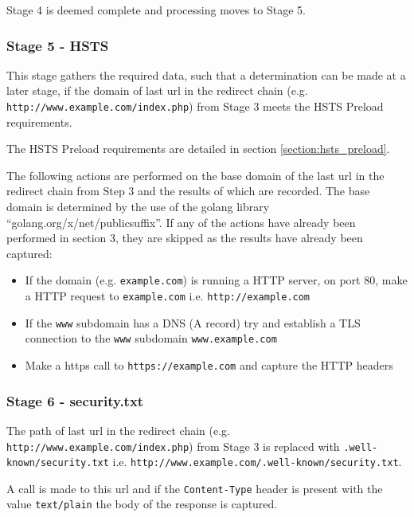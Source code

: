 \documentclass{mscreport}
\begin{document}
\vspace{0.3cm} \noindent
Stage 4 is deemed complete and processing moves to Stage 5.

\subsubsection{Stage 5 - HSTS}

This stage gathers the required data, such that a determination can be made at a later stage, if the domain of last url in the redirect chain (e.g. \texttt{http://www.example.com/index.php}) from Stage 3 meets the HSTS Preload requirements.

\vspace{0.3cm} \noindent
The HSTS Preload requirements are detailed in section \ref{section:hsts_preload}.

\vspace{0.3cm} \noindent
The following actions are performed on the base domain of the last url in the redirect chain from Step 3 and the results of which are recorded. The base domain is determined by the use of the golang library ``golang.org/x/net/publicsuffix''. If any of the actions have already been performed in section 3, they are skipped as the results have already been captured:

\begin{itemize}
	\setlength\itemsep{0.1em}
    \item If the domain (e.g. \texttt{example.com}) is running a HTTP server, on port 80, make a HTTP request to \texttt{example.com} i.e. \texttt{http://example.com}
    \item If the \texttt{www} subdomain has a DNS (A record) try and establish a TLS connection to the \texttt{www} subdomain \texttt{www.example.com}
    \item Make a https call to \texttt{https://example.com} and capture the HTTP headers
\end{itemize}


\subsubsection{Stage 6 - security.txt}

The path of last url in the redirect chain (e.g. \texttt{http://www.example.com/index.php}) from Stage 3 is replaced with \texttt{.well-known/security.txt} i.e. \newline \texttt{http://www.example.com/.well-known/security.txt}.

\vspace{0.3cm} \noindent
A call is made to this url and if the \texttt{Content-Type} header is present with the value \texttt{text/plain} the body of the response is captured.
\end{document}

